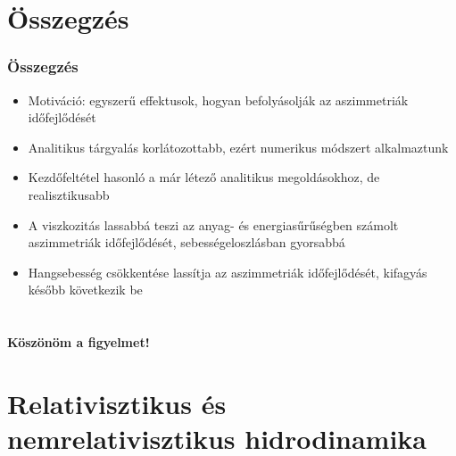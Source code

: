 \documentclass{beamer}
\begin{document}
\section{Összegzés}
\begin{frame}
\frametitle{Összegzés}
\begin{itemize}
\setlength{\itemsep}{16pt}
\item<1-> Motiváció: egyszerű effektusok, hogyan befolyásolják az aszimmetriák időfejlődését
\item<1-> Analitikus tárgyalás korlátozottabb, ezért numerikus módszert alkalmaztunk
\item<2-> Kezdőfeltétel hasonló a már létező analitikus megoldásokhoz, de realisztikusabb
\item<3-> A viszkozitás lassabbá teszi az anyag- és energiasűrűségben számolt aszimmetriák időfejlődését, sebességeloszlásban gyorsabbá
\item<4-> Hangsebesség csökkentése lassítja az aszimmetriák időfejlődését, kifagyás később következik be
\end{itemize}
\end{frame}

\section{}
\begin{frame}
\begin{center}
\textbf{\huge{Köszönöm a figyelmet!}}
\end{center}
\end{frame}

\section{Relativisztikus és nemrelativisztikus hidrodinamika}
\end{document}
